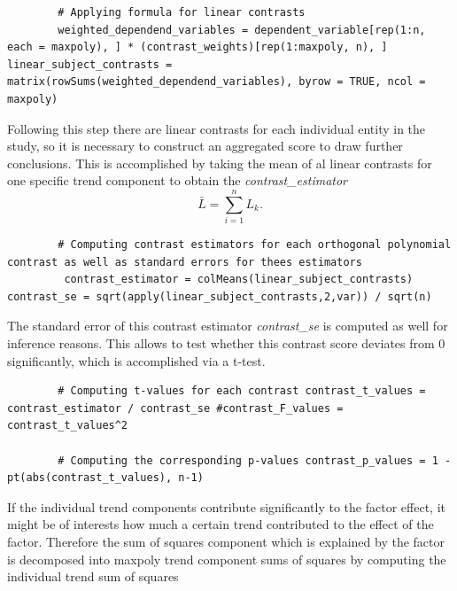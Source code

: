 \documentclass[11pt]{article}
\begin{document}
		\begin{lstlisting}
		# Applying formula for linear contrasts 
		weighted_dependend_variables = dependent_variable[rep(1:n, each = maxpoly), ] * (contrast_weights)[rep(1:maxpoly, n), ] linear_subject_contrasts = matrix(rowSums(weighted_dependend_variables), byrow = TRUE, ncol = maxpoly)
		\end{lstlisting}
		
		Following this step there are linear contrasts for each individual entity in the study, so it is necessary to construct an aggregated score to draw further conclusions. This is accomplished by taking the mean of al linear contrasts for one specific trend component to obtain the \textit{contrast\_estimator}\\
		
		\begin{equation}
		\bar{L} = \sum_{i=1}^{n}L_k.
		\end{equation}
		
		\vspace{8 mm}
		
		\begin{lstlisting}
		# Computing contrast estimators for each orthogonal polynomial contrast as well as standard errors for thees estimators
		 contrast_estimator = colMeans(linear_subject_contrasts) contrast_se = sqrt(apply(linear_subject_contrasts,2,var)) / sqrt(n)
		\end{lstlisting}
		
		The standard error of this contrast estimator \textit{contrast\_se} is computed as well for inference reasons. This allows to test whether this contrast score deviates from 0 significantly, which is accomplished via a t-test.\\
		
		\begin{lstlisting}
		# Computing t-values for each contrast contrast_t_values = contrast_estimator / contrast_se #contrast_F_values = contrast_t_values^2
		
		# Computing the corresponding p-values contrast_p_values = 1 - pt(abs(contrast_t_values), n-1)
		\end{lstlisting}
		
		If the individual trend components contribute significantly to the factor effect, it might be of interests how much a certain trend contributed to the effect of the factor. Therefore the sum of squares component which is explained by the factor is decomposed into maxpoly trend component sums of squares by computing the individual trend sum of squares\\
		
\end{document}
